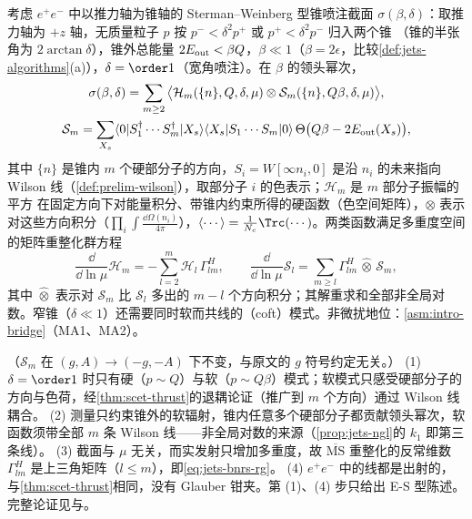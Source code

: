\begin{theorem}\label{thm:jets-ngl-factorization}
考虑 $e^+e^-$ 中以推力轴为锥轴的 Sterman--Weinberg 型锥喷注截面 $\sigma(\beta,\delta)$：取推力轴为 $+z$ 轴，无质量粒子 $p$ 按 $p^-<\delta^2p^+$ 或 $p^+<\delta^2p^-$ 归入两个锥
（锥的半张角为 $2\arctan\delta$），锥外总能量 $2E_{\rm out}<\beta Q$，$\beta\ll1$（$\beta=2\epsilon$，比较\cref{def:jets-algorithms}(a)），$\delta=\order1$（宽角喷注）。在 $\beta$ 的领头幂次，
\begin{equation}\label{eq:jets-bnrs}
\begin{gathered}
\sigma(\beta,\delta)=\sum_{m\ge2}\big\langle\mathcal H_m(\{n\},Q,\delta,\mu)\otimes\mathcal S_m(\{n\},Q\beta,\delta,\mu)\big\rangle,\\
\mathcal S_m=\sum_{X_s}\langle0|S_1^\dagger\cdots S_m^\dagger|X_s\rangle\langle X_s|S_1\cdots S_m|0\rangle\,\Theta\big(Q\beta-2E_{\rm out}(X_s)\big),
\end{gathered}
\end{equation}
其中 $\{n\}$ 是锥内 $m$ 个硬部分子的方向，$S_i=W[\infty n_i,0]$ 是沿 $n_i$ 的未来指向 Wilson 线（\cref{def:prelim-wilson}），取部分子 $i$ 的色表示；$\mathcal H_m$ 是 $m$ 部分子振幅的平方
在固定方向下对能量积分、带锥内约束所得的硬函数（色空间矩阵），$\otimes$ 表示对这些方向积分（$\prod_i\int\frac{\dd\Omega(n_i)}{4\pi}$），$\langle\cdots\rangle=\frac{1}{N_c}\Trc(\cdots)$。两类函数满足多重度空间的矩阵重整化群方程
\begin{equation}\label{eq:jets-bnrs-rg}
\frac{\dd}{\dd\ln\mu}\mathcal H_m=-\sum_{l=2}^{m}\mathcal H_l\,\Gamma^H_{lm},\qquad
\frac{\dd}{\dd\ln\mu}\mathcal S_l=\sum_{m\ge l}\Gamma^H_{lm}\,\hat\otimes\,\mathcal S_m ,
\end{equation}
其中 $\hat\otimes$ 表示对 $\mathcal S_m$ 比 $\mathcal S_l$ 多出的 $m-l$ 个方向积分；其解重求和全部非全局对数。窄锥（$\delta\ll1$）还需要同时软而共线的（coft）模式。非微扰地位：\cref{asm:intro-bridge}（MA1、MA2）。
\end{theorem}

\begin{proofsketch}
（$\mathcal S_m$ 在 $(g,A)\to(-g,-A)$ 下不变，与原文\cite{Becher:2016mmh}的 $g$ 符号约定无关。）
(1) $\delta=\order1$ 时只有硬（$p\sim Q$）与软（$p\sim Q\beta$）模式；软模式只感受硬部分子的方向与色荷，经\cref{thm:scet-thrust}的退耦论证（推广到 $m$ 个方向）通过 Wilson 线耦合。
(2) 测量只约束锥外的软辐射，锥内任意多个硬部分子都贡献领头幂次，软函数须带全部 $m$ 条 Wilson 线——非全局对数的来源（\cref{prop:jets-ngl}的 $k_1$ 即第三条线）。
(3) 截面与 $\mu$ 无关，而实发射只增加多重度，故 $\overline{\mathrm{MS}}$ 重整化的反常维数 $\Gamma^H_{lm}$ 是上三角矩阵（$l\le m$），即\cref{eq:jets-bnrs-rg}。
(4) $e^+e^-$ 中的线都是出射的，与\cref{thm:scet-thrust}相同，没有 Glauber 钳夹。第 (1)、(4) 步只给出 E-S 型陈述。完整论证见\cite[第~2~节]{Becher:2016mmh}与\cite{Becher:2015hka}。
\end{proofsketch}

